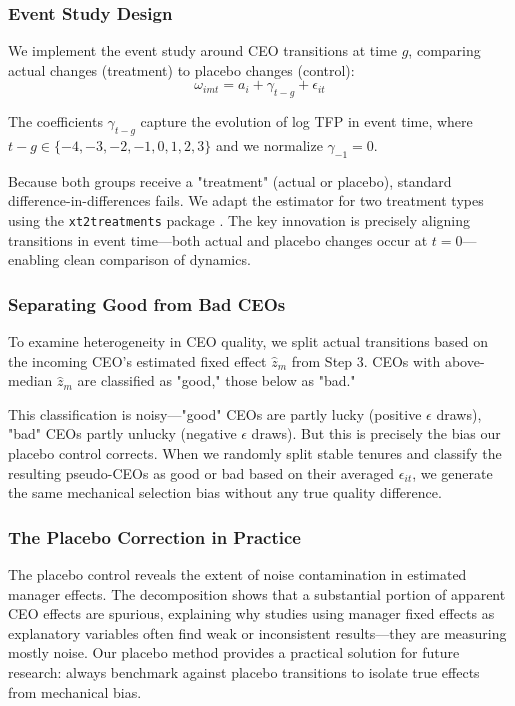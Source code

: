 \documentclass[11pt,a4paper]{article}
\begin{document}
\subsubsection{Event Study Design}

We implement the event study around CEO transitions at time $g$, comparing actual changes (treatment) to placebo changes (control):
\begin{equation}
\omega_{imt} = a_i + \gamma_{t-g} + \epsilon_{it}
\end{equation}

The coefficients $\gamma_{t-g}$ capture the evolution of log TFP in event time, where $t-g \in \{-4, -3, -2, -1, 0, 1, 2, 3\}$ and we normalize $\gamma_{-1} = 0$.

Because both groups receive a "treatment" (actual or placebo), standard difference-in-differences fails. We adapt the \citet{Callaway2021JoLE} estimator for two treatment types using the \texttt{xt2treatments} package \citep{Koren2024xt2treatments}. The key innovation is precisely aligning transitions in event time—both actual and placebo changes occur at $t=0$—enabling clean comparison of dynamics.

\subsubsection{Separating Good from Bad CEOs}

To examine heterogeneity in CEO quality, we split actual transitions based on the incoming CEO's estimated fixed effect $\hat{z}_m$ from Step 3. CEOs with above-median $\hat{z}_m$ are classified as "good," those below as "bad."

This classification is noisy—"good" CEOs are partly lucky (positive $\epsilon$ draws), "bad" CEOs partly unlucky (negative $\epsilon$ draws). But this is precisely the bias our placebo control corrects. When we randomly split stable tenures and classify the resulting pseudo-CEOs as good or bad based on their averaged $\epsilon_{it}$, we generate the same mechanical selection bias without any true quality difference.

\subsubsection{The Placebo Correction in Practice}

The placebo control reveals the extent of noise contamination in estimated manager effects. The decomposition shows that a substantial portion of apparent CEO effects are spurious, explaining why studies using manager fixed effects as explanatory variables often find weak or inconsistent results—they are measuring mostly noise. Our placebo method provides a practical solution for future research: always benchmark against placebo transitions to isolate true effects from mechanical bias.
\end{document}
